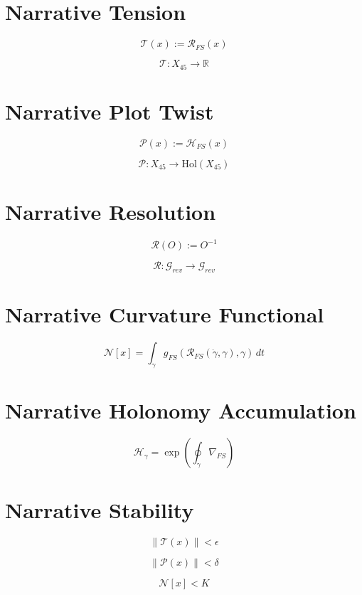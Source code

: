 
\section*{Narrative Tension}

\[
\mathcal{T}(x) := \mathcal{R}_{FS}(x)
\]

\[
\mathcal{T} : X_{45} \to \mathbb{R}
\]


\section*{Narrative Plot Twist}

\[
\mathcal{P}(x) := \mathcal{H}_{FS}(x)
\]

\[
\mathcal{P} : X_{45} \to \mathrm{Hol}(X_{45})
\]


\section*{Narrative Resolution}

\[
\mathcal{R}(O) := O^{-1}
\]

\[
\mathcal{R} : \mathcal{G}_{rev} \to \mathcal{G}_{rev}
\]


\section*{Narrative Curvature Functional}

\[
\mathcal{N}[x]
= \int_{\gamma}
g_{FS}(\mathcal{R}_{FS}(\dot{\gamma},\gamma), \gamma)\, dt
\]


\section*{Narrative Holonomy Accumulation}

\[
\mathcal{H}_{\gamma}
= \exp\left( \oint_{\gamma} \nabla_{FS} \right)
\]


\section*{Narrative Stability}

\[
\|\mathcal{T}(x)\| < \epsilon
\]

\[
\|\mathcal{P}(x)\| < \delta
\]

\[
\mathcal{N}[x] < K
\]

